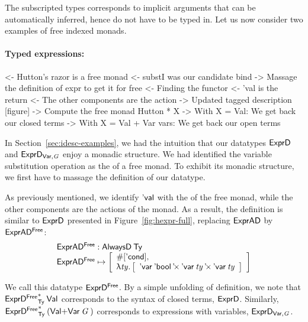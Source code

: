 The subscripted types corresponds to implicit arguments that can be
automatically inferred, hence do not have to be typed in. Let us now
consider two examples of free indexed monads.


\paragraph{Typed expressions:}

\begin{wstructure}
<- Hutton's razor is a free monad
    <- substI was our candidate bind
        -> Massage the definition of expr to get it for free
    <- Finding the functor
        <- 'val is the return
        <- The other components are the action
        -> Updated tagged description [figure]
    -> Compute the free monad Hutton * X
        -> With X = Val: We get back our closed terms
        -> With X = Val + Var vars: We get back our open terms
\end{wstructure}

In Section~\ref{sec:idesc-examples}, we had the intuition that our
datatypes $\HExprD$ and $\HExprVarD{\V{G}}$ enjoy a monadic
structure. We had identified the variable substitution operation as
the \bind of a free monad. To exhibit its monadic structure, we first
have to massage the definition of our datatype.

As previously mentioned, we identify $\SYMBEval$ with the \return of
the free monad, while the other components are the actions of the
monad. As a result, the definition is similar to $\HExprD$ presented
in Figure~\ref{fig:hexpr-full}, replacing $\HExprAD$ by
$\HExprAFreeD$:
%
\[\stk{
\HExprAFreeD : \ATagIDesc{\Ty} \\
\HExprAFreeD \mapsto \bigRedBracket{
                 \begin{array}{l}
                   \EnumT{\sqr{\SYMBEcond}} \red{,} \\
                   \LAM{\V{ty}}
                   \bigRedBracket{
                   \begin{array}{l}
                   \DProd{\DVar{\Ebool}}{\DProd{\DVar{\V{ty}}}{\DVar{\V{ty}}}}
                   \end{array}
                   }
                 \end{array}
                 }
}\]

We call this datatype $\HExprFreeD$. By a simple unfolding of
definition, we note that $\FreeIMonad{\HExprFreeD}{\Ty}{\SYMBVal}$
corresponds to the syntax of closed terms, $\HExprD$. Similarly,
$\FreeIMonad{\HExprFreeD}{\Ty}{(\SUM{\SYMBVal}{\Var{\V{G}}{}})}$
corresponds to expressions with variables, $\HExprVarD{\V{G}}$.

